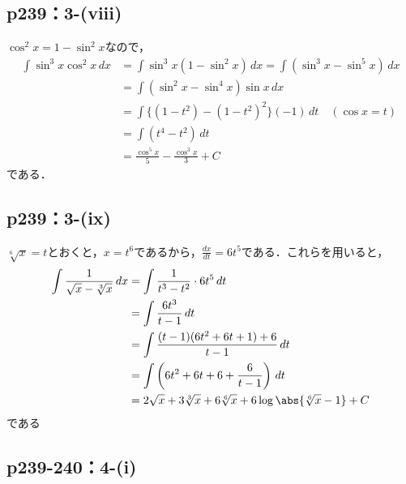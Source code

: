 \documentclass[uplatex,dvipdfmx,a4paper,10pt,fleqn]{jsarticle}
\begin{document}
\subsection*{p239：3-(viii)}

\begin{tleftbar}
    $\cos ^2 x = 1- \sin ^2 x$なので，
    \begin{align*}
        \int \sin ^3 x \cos ^2 x \, dx & = \int \sin ^3 x (1-\sin ^2 x) \, dx = \int (\sin ^3 x - \sin ^5 x ) \, dx \\
        & = \int (\sin ^2 x - \sin ^4 x) \sin x \, dx \\
        & = \int \{ (1-t^2)- (1-t^2)^2 \} (-1) \, dt \quad (\cos x =t) \\
        & = \int (t^4 -t^2) \, dt \\
        & = \frac{\cos ^5 x}{5}-\frac{\cos ^3 x}{3}+C
    \end{align*}
    である．
\end{tleftbar}

\subsection*{p239：3-(ix)}

\begin{tleftbar}
    $\sqrt[6]{x}=t$とおくと，$x=t^6$であるから，$\frac{dx}{dt}=6t^5$である．これらを用いると，
    \begin{align*}
        \int \frac{1}{\sqrt{x}-\sqrt[3]{x}} \, dx & = \int \frac{1}{t^3-t^2} \cdot 6t^5 \, dt \\
        & = \int \frac{6t^3}{t-1} \, dt \\
        & = \int \frac{(t-1)(6t^2+6t+1)+6}{t-1} \, dt \\
        & = \int \left (6t^2+6t+6 + \frac{6}{t-1}\right) \, dt \\
        & = 2\sqrt{x}+3 \sqrt[3]{x} + 6 \sqrt[6]{x} + 6 \log \abs{\sqrt[6]{x}-1}+ C
    \end{align*}
    である
\end{tleftbar}


\subsection*{p239-240：4-(i)}
\end{document}
